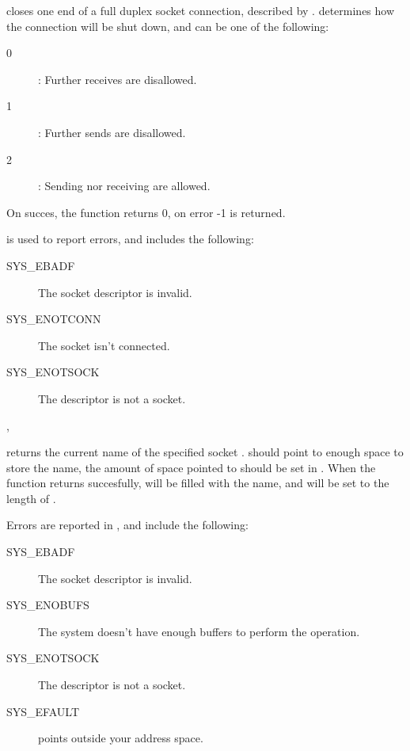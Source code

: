 { closes one end of a full duplex socket connection, described
by .  determines how the connection will be shut down,
and can be one of the following:
\begin{description}
\item[0] : Further receives are disallowed.
\item[1] : Further sends are disallowed.
\item[2] : Sending nor receiving are allowed.
\end{description}

On succes, the function returns 0, on error -1 is returned.
}
{ is used to report errors, and includes the following:
\begin{description}
\item[SYS\_EBADF] The socket descriptor is invalid.
\item[SYS\_ENOTCONN] The socket isn't connected.
\item[SYS\_ENOTSOCK] The descriptor is not a socket.
\end{description}
}{, }

{ returns the current name of the specified socket
.  should point to enough space to store the name, the
amount of space pointed to should be set in . 
When the function returns succesfully,  will be filled with the 
name, and  will be set to the length of .}
{Errors are reported in , and include the following:
\begin{description}
\item[SYS\_EBADF] The socket descriptor is invalid.
\item[SYS\_ENOBUFS] The system doesn't have enough buffers to perform the
operation.
\item[SYS\_ENOTSOCK] The descriptor is not a socket.
\item[SYS\_EFAULT]  points outside your address space.
\end{description}
}{}

